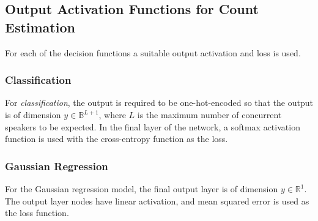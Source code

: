 \subsection{Output Activation Functions for Count Estimation}%
\label{ssec:objectives}
For each of the decision functions a suitable output activation and loss is used.


\subsubsection{Classification}
For \emph{classification}, the output is required to be one-hot-encoded so that the output is of dimension \(y \in \mathbb{B}^{L + 1}\), where \(L\) is the maximum number of concurrent speakers to be expected.
In the final layer of the network, a softmax activation function is used with the cross-entropy function as the loss.
%

\subsubsection{Gaussian Regression}
For the Gaussian regression model, the final output layer is of dimension \(y \in \mathbb{R}^{1}\).
The output layer nodes have linear activation, and mean squared error is used as the loss function.
%
%

